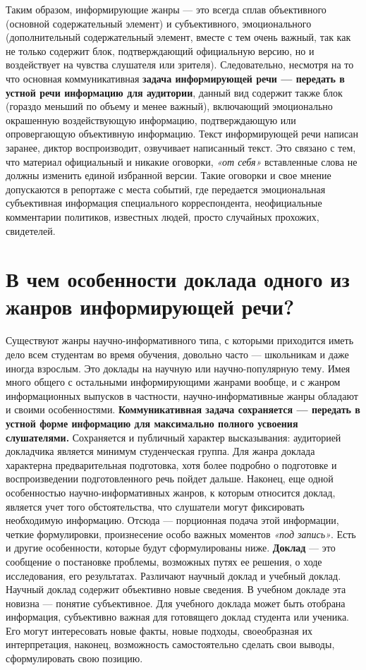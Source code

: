 Таким образом, информирующие жанры — это всегда сплав объективного (основной содержательный элемент) и субъективного, эмоционального (дополнительный содержательный элемент, вместе с тем очень важный, так как не только содержит блок, подтверждающий официальную версию, но и воздействует на чувства слушателя или зрителя). Следовательно, несмотря на то что основная коммуникативная \textbf{задача информирующей речи — передать в устной речи информацию для аудитории}, данный вид содержит также блок (гораздо меньший по объему и менее важный), включающий эмоционально окрашенную воздействующую информацию, подтверждающую или опровергающую объективную информацию. Текст информирующей речи написан заранее, диктор воспроизводит, озвучивает написанный текст. Это связано с тем, что материал официальный и никакие оговорки, \textit{«от себя»} вставленные слова не должны изменить единой избранной версии. Такие оговорки и свое мнение допускаются в репортаже с места событий, где передается эмоциональная субъективная информация специального корреспондента, неофициальные комментарии политиков, известных людей, просто случайных прохожих, свидетелей. 
\chapter{\textbf{В чем особенности доклада одного из жанров информирующей речи?}}
Существуют жанры научно-информативного типа, с которыми приходится иметь дело всем студентам во время обучения, довольно часто — школьникам и даже иногда взрослым. Это доклады на научную или научно-популярную тему. Имея много общего с остальными информирующими жанрами вообще, и с жанром информационных выпусков в частности, научно-информативные жанры обладают и своими особенностями. \textbf{Коммуникативная задача сохраняется — передать в устной форме информацию для максимально полного усвоения слушателями.} Сохраняется и публичный характер высказывания: аудиторией докладчика является минимум студенческая группа. Для жанра доклада характерна предварительная подготовка, хотя более подробно о подготовке и воспроизведении подготовленного речь пойдет дальше. Наконец, еще одной особенностью научно-информативных жанров, к которым относится доклад, является учет того обстоятельства, что слушатели могут фиксировать необходимую информацию. Отсюда — порционная подача этой информации, четкие формулировки, произнесение особо важных моментов \textit{«под запись»}. Есть и другие особенности, которые будут сформулированы ниже.
\textbf{Доклад }— это сообщение о постановке проблемы, возможных путях ее решения, о ходе исследования, его результатах. Различают научный доклад и учебный доклад. Научный доклад содержит объективно новые сведения. В учебном докладе эта новизна — понятие субъективное. Для учебного доклада может быть отобрана информация, субъективно важная для готовящего доклад студента или ученика. Его могут интересовать новые факты, новые подходы, своеобразная их интерпретация, наконец, возможность самостоятельно сделать свои выводы, сформулировать свою позицию.
